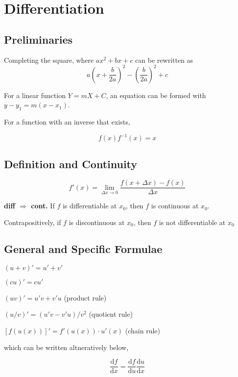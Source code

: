 
\section{Differentiation}

\subsection*{Preliminaries}

Completing the square, where $ax^2 + bx + c$ can be rewritten as
\begin{equation*}
  a\left(x + \frac{b}{2a}\right)^2 - \left(\frac{b}{2a}\right)^2 + c
\end{equation*}


For a linear function $Y = mX + C$, an equation can be formed with $y - y_1 = m(x - x_1)$.
\newline

For a function with an inverse that exists,

\begin{equation*}
  f(x) f^{-1}(x) = x
\end{equation*}

\subsection*{Definition and Continuity}
\begin{equation*}
  f'(x) = \lim_{\Delta x \rightarrow 0} \frac{f(x + \Delta x) - f(x)}{\Delta x}
\end{equation*}

\textbf{diff $\Rightarrow$ cont. }If $f$ is differentiable at $x_0$, then $f$ is continuous at $x_0$. 

Contrapositively, if $f$ is discontinuous at $x_0$, then $f$ is not differentiable at $x_0$

\subsection*{General and Specific Formulae}

$(u + v)' = u' + v'$

$(cu)' = cu'$

$(uv)' = u'v + v'u$ (product rule)

$(u/v)' = (u'v - v'u) / v^2$ (quotient rule)

$[f(u(x))]' = f'(u(x)) \cdot u'(x)$ (chain rule)

which can be written altneratively below,

$$\frac{\mathrm{d}f}{\mathrm{d}x} = \frac{\mathrm{d}f}{\mathrm{d}u} \frac{\mathrm{d}u}{\mathrm{d}x}$$

